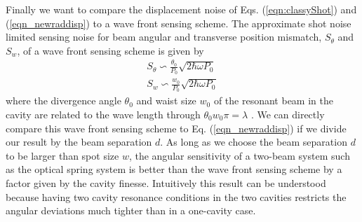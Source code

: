 Finally we want to compare the displacement noise of Eqs. (\ref{eqn:classyShot}) and (\ref{eqn_newraddisp}) to a wave front sensing scheme.
The approximate shot noise limited sensing noise for beam angular and transverse position mismatch, $S_\theta$ and $S_w$, of a wave front sensing scheme is given by
\begin{align}
\label{eqn:WFSShot}
S_\theta \backsim \frac{\theta_0}{P_0} \sqrt{2 \hbar \omega P_0} \\
S_w \backsim \frac{w_0}{P_0} \sqrt{2 \hbar \omega P_0}
\end{align}
where the divergence angle $\theta_0$ and waist size $w_0$ of the resonant beam in the cavity are related to the wave length through $\theta_0  w_0  \pi  = \lambda$ \cite{MavThesis}. We can directly compare this wave front sensing scheme to Eq. (\ref{eqn_newraddisp}) if we divide our result by the beam separation $d$.
As long as we choose the beam separation $d$ to be larger than spot size $w$,
 the angular sensitivity of a two-beam system such as the optical spring system
is better than the wave front sensing scheme 
by a factor given by the cavity finesse. Intuitively this result can be understood because having two cavity resonance conditions in the two cavities restricts the angular deviations much tighter than in a one-cavity case. 


